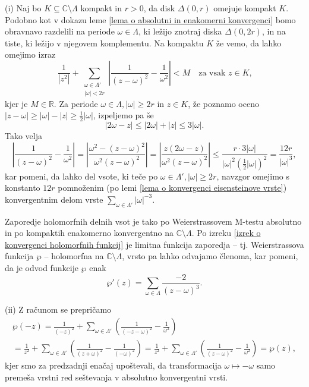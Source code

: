 \documentclass[mat1]{fmfdelo}
\numberwithin{equation}{section}
\newcommand{\R}{\mathbb R}
\newcommand{\N}{\mathbb N}
\newcommand{\C}{\mathbb C}
\newcommand{\om}{\omega}
\newcommand{\abs}[1]{\left\lvert #1 \right\rvert}
\newcommand{\disk}[2]{\Delta(#1, #2)}
\theoremstyle{definition}
\begin{document}
\begin{dokaz}
    (i) Naj bo $K \subseteq \C\setminus\Lambda$ kompakt in $r > 0$, da disk $\disk{0}{r}$ omejuje kompakt $K$. Podobno kot v dokazu leme \ref{lema o absolutni in enakomerni konvergenci} bomo obravnavo razdelili na periode $\om\in \Lambda$, ki ležijo znotraj diska $\disk{0}{2r}$, in na tiste, ki ležijo v njegovem komplementu. Na kompaktu $K$ že vemo, da lahko omejimo izraz
    \[
        \frac{1}{\abs{z^2}} + \sum_{\substack{\om\in\Lambda' \\ \abs{\om} < 2r}} \left\lvert\frac{1}{(z - \om)^2} - \frac{1}{\om^2}\right\rvert < M \quad \text{za vsak $z \in K$,}
    \]
    kjer je $M \in \R$.
    Za periode $\om\in\Lambda, \abs{\om} \geq 2r$ in $z \in K$, že poznamo oceno $\abs{z - \om} \geq \abs{\om} - \abs{z} \geq \frac{1}{2}\abs{\om}$, izpeljemo pa še
    \[
        \abs{2\om - z} \leq \abs{2\om} + \abs{z} \leq 3 \abs{\om}.
    \]
    Tako velja
    \[
        \abs{\frac{1}{(z - \om)^2} - \frac{1}{\om^2}} = 
        \abs{\frac{\om^2 - (z - \om)^2}{\om^2(z - \om)^2}} =
        \abs{\frac{z(2\om - z)}{\om^2 (z - \om)^2}} \leq
        \frac{r \cdot 3\abs{\om}}{\abs{\om}^2(\frac{1}{2}\abs{\om})^2} = 
        \frac{12r}{\abs{\om}^3},
    \]
    kar pomeni, da lahko del vsote, ki teče po $\om\in\Lambda', \abs{\om} \geq 2r$, navzgor omejimo s konstanto $12r$ pomnoženim (po lemi \ref{lema o konvergenci eisensteinove vrste}) konvergentnim delom vrste $\sum_{\om\in\Lambda'}\abs{\om}^{-3}$.

    Zaporedje holomorfnih delnih vsot je tako po Weierstrassovem M-testu absolutno in po kompaktih enakomerno konvergentno na $\C\setminus\Lambda$. Po izreku \ref{izrek o konvergenci holomorfnih funkcij} je limitna funkcija zaporedja -- tj. Weierstrassova funkcija $\wp$ -- holomorfna na $\C\setminus\Lambda$, vrsto pa lahko odvajamo členoma, kar pomeni, da je odvod funkcije $\wp$ enak
    \[
        \wp'(z) = \sum_{\om \in \Lambda}\frac{-2}{(z-\om)^3}. 
    \]

    (ii) Z računom se prepričamo
    \begin{multline*}
        \wp(-z) =   
        \frac{1}{(-z)^2} + \sum_{\om\in\Lambda'}\left(\frac{1}{(-z-\om)^2} - \frac{1}{\om^2}\right) \\ = 
        \frac{1}{z^2} + \sum_{\om\in\Lambda'}\left(\frac{1}{(z+\om)^2} - \frac{1}{(-\om)^2}\right) =
        \frac{1}{z^2} + \sum_{\om\in\Lambda'}\left(\frac{1}{(z-\om)^2} - \frac{1}{\om^2}\right) =
        \wp(z),
    \end{multline*}
    kjer smo za predzadnji enačaj upoštevali, da transformacija $\omega \mapsto -\omega$ samo premeša vrstni red seštevanja v absolutno konvergentni vrsti.


\end{dokaz}
\end{document}
